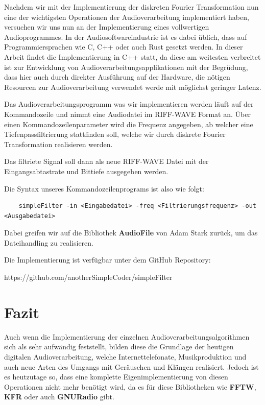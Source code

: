 \documentclass[paper=a4,fontsize=12pt,ngerman]{scrartcl}
\begin{document}
Nachdem wir mit der Implementierung der diskreten Fourier Transformation nun eine der wichtigsten Operationen der Audioverarbeitung implementiert haben, versuchen wir uns nun an der Implementierung eines vollwertigen Audioprogrammes.
In der Audiosoftwareindustrie ist es dabei üblich, dass auf Programmiersprachen wie C, C++ oder auch Rust gesetzt werden. In dieser Arbeit findet die Implementierung in C++ statt, da diese am weitesten verbreitet ist zur Entwicklung von
Audioverarbeitungsapplikationen mit der Begrüdung, dass hier auch durch direkter Ausführung auf der Hardware, die nötigen Resourcen zur Audioverarbeitung verwendet werde mit möglichst geringer Latenz.

Das Audioverarbeitungsprogramm was wir implementieren werden läuft auf der Kommandozeile und nimmt eine Audiodatei im RIFF-WAVE Format an.
Über einen Kommandozeilenparameter wird die Frequenz angegeben, ab welcher eine Tiefenpassfiltrierung stattfinden soll, welche wir durch diskrete Fourier Transformation realisieren werden.

Das filtriete Signal soll dann als neue RIFF-WAVE Datei mit der Eingangsabtastrate und Bittiefe ausgegeben werden.

Die Syntax unseres Kommandozeilenprograms ist also wie folgt:

\begin{lstlisting}
    simpleFilter -in <Eingabedatei> -freq <Filtrierungsfrequenz> -out <Ausgabedatei>
\end{lstlisting}

Dabei greifen wir auf die Bibliothek \textbf{AudioFile} von Adam Stark zurück, um das Dateihandling zu realisieren. 

Die Implementierung ist verfügbar unter dem GitHub Repository:

https://github.com/anotherSimpleCoder/simpleFilter

\section{Fazit}

Auch wenn die Implementierung der einzelnen Audioverarbeitungsalgorithmen sich als sehr aufwändig feststellt, bilden diese die Grundlage der heutigen digitalen Audioverarbeitung, welche
Internettelefonate, Musikproduktion und auch neue Arten des Umgangs mit Geräuschen und Klängen realisiert. Jedoch ist es heutzutage so, dass eine komplette Eigenimplementierung von diesen Operationen nicht mehr benötigt wird, da
es für diese Bibliotheken wie \textbf{FFTW}, \textbf{KFR} oder auch \textbf{GNURadio} gibt.

\clearpage
\renewcommand\refname{Literaturverzeichnis}




\clearpage
\end{document}

